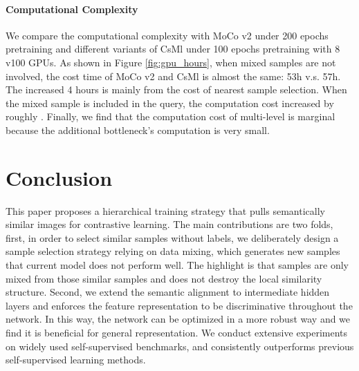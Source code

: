 \documentclass[10pt,twocolumn,letterpaper]{article}
\begin{document}
\vspace{-0.15in}
\paragraph{Computational Complexity} We compare the computational complexity with MoCo v2 under 200 epochs pretraining and different variants of CsMl under 100 epochs pretraining with 8 v100 GPUs. As shown in Figure \ref{fig:gpu_hours}, when mixed samples are not involved, the cost time of MoCo v2 and CsMl is almost the same: 53h v.s. 57h. The increased 4 hours is mainly from the cost of nearest sample selection. When the mixed sample is included in the query, the computation cost increased by roughly . Finally, we find that the computation cost of multi-level is marginal because the additional bottleneck's computation is very small.





































\section{Conclusion}
This paper proposes a hierarchical training strategy that pulls semantically similar images  for contrastive learning. The main contributions are two folds, first, in order to select similar samples without labels, we deliberately design a sample selection strategy relying on data mixing, which generates new samples that current model does not perform well. The highlight is that samples are only mixed from those similar samples and does not destroy the local similarity structure. Second, we extend the semantic alignment to intermediate hidden layers and enforces the feature representation to be discriminative throughout the network. In this way, the network can be optimized in a more robust way and we find it is beneficial for general representation. We conduct extensive experiments on widely used self-supervised benchmarks, and consistently outperforms previous self-supervised learning methods.
{\small


}
\end{document}
